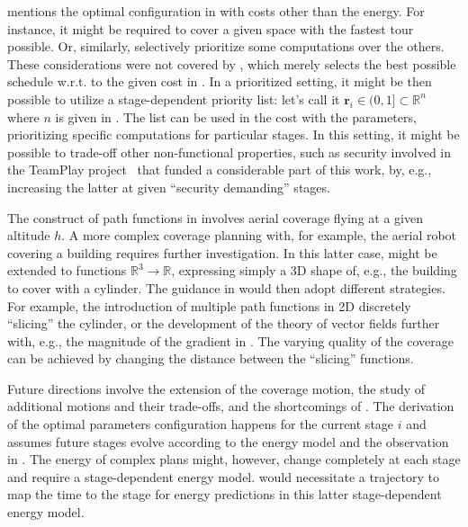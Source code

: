 
 mentions the optimal configuration in  with costs other than the energy. For instance, it might be required to cover a given space with the fastest tour possible. Or, similarly, selectively prioritize some computations over the others. These considerations were not covered by , which merely selects the best possible schedule w.r.t. to the given cost in . In a prioritized setting, it might be then possible to utilize a stage-dependent priority list: let's call it $\mathbf{r}_i\in(0,1]\subset\mathbb{R}^n$ where $n$ is given in . The list can be used in the cost with the parameters,  prioritizing specific computations for particular stages. In this setting, it might be possible to trade-off other non-functional properties, such as security involved in the TeamPlay project~\citep{teamplay} that funded a considerable part of this work, by, e.g., increasing the latter at given ``security demanding'' stages.


The construct of path functions in  involves aerial coverage flying at a given altitude $h$. A more complex coverage planning with, for example, the aerial robot covering a building requires further investigation. In this latter case,  might be extended to functions $\mathbb{R}^3\rightarrow\mathbb{R}$, expressing simply a 3D shape of, e.g., the building to cover with a cylinder. The guidance in  would then adopt different strategies. For example, the introduction of multiple path functions in 2D discretely ``slicing'' the cylinder, or the development of the theory of vector fields further with, e.g., the magnitude of the gradient in . The varying quality of the coverage can be achieved by changing the distance between the ``slicing'' functions.


Future directions involve the extension of the coverage motion, the study of additional motions and their trade-offs, and the shortcomings of . The derivation of the optimal parameters configuration happens for the current stage $i$ and assumes future stages evolve according to the energy model and the observation in . The energy of complex plans might, however, change completely at each stage and require a stage-dependent energy model.  would necessitate a trajectory to map the time to the stage for energy predictions in this latter stage-dependent energy model.

